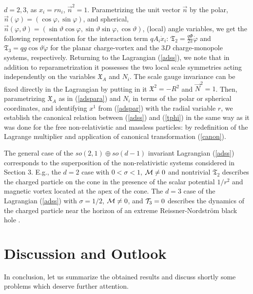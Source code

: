 \documentclass[a4paper,12pt]{article}
\def\X{\mathfrak X}
\begin{document}
$d=2,3$,
as $x_i=rn_i$,
$\vec n^2=1$.
Parametrizing the
unit vector $\vec n$ by the polar,
$\vec n(\varphi)=(\cos \varphi,\sin \varphi)$,
and spherical,
$\vec n(\varphi, \vartheta)=(\sin\vartheta\cos\varphi,
\sin\vartheta\sin\varphi,\cos\vartheta)$,
(local) angle variables,
we get the following representation for
the interaction term $qA_i\dot x_i$:
${\mathfrak T}_2=\frac{q\Phi}{2\pi}\dot{\varphi}$
and  ${\mathfrak T}_3=qg\cos \vartheta \dot{\varphi}$
for the planar charge-vortex
and the
$3D$ charge-monopole systems, respectively.
Returning to
the Lagrangian (\ref{adss}),
we note that in addition to
reparametrization it possesses the
two local scale symmetries
acting independently on the variables $\X_A$ and $N_i$.
The scale gauge invariance can be fixed
directly in the Lagrangian
by putting in it $\X^2=-R^2$ and $\vec N^2=1$.
Then,  parametrizing $\X_A$ as in
(\ref{adspara}) and $N_i$ in terms of
the polar or spherical coordinates,
and identifying
$x^1$ from (\ref{adspar})
with the radial variable $r$,
we establish the canonical relation
between (\ref{adss})
and (\ref{tphi}) in the same way
as it was done for the free non-relativistic
and massless particles:
by redefinition of the Lagrange multiplier
and  application of canonical transformation (\ref{canon}).

The general case of the
$so(2,1)\oplus so(d-1)$ invariant Lagrangian (\ref{adss})
corresponds to the
superposition
of the non-relativistic systems considered in Section 3.
E.g., the $d=2$ case with $0<\sigma<1$, ${\cal M}\neq 0$
and nontrivial ${\mathfrak T}_2$
describes the charged particle on the cone
in the presence of the
scalar potential $1/r^2$ and magnetic
vortex located
at the apex of the cone.
The $d=3$ case of the Lagrangian (\ref{adss})
with $\sigma=1/2$, ${\cal M}\neq 0$, and
${\cal T}_3=0$
describes the dynamics of the charged particle near the
horizon of an extreme Reissner-Nordstr\"om
black hole \cite{kallosh,Bell}.



\section{Discussion and Outlook}

In conclusion, let us summarize
the obtained results and discuss shortly
some problems which deserve further attention.
\end{document}
